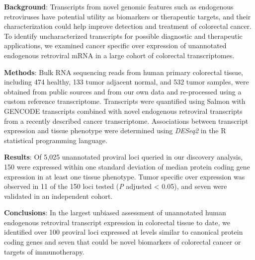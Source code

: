 \textbf{Background}:
Transcripts from novel genomic features such as endogenous retroviruses have potential utility as biomarkers or therapeutic targets, and their characterization could help improve detection and treatment of colorectal cancer.
To identify uncharacterized transcripts for possible diagnostic and therapeutic applications, we examined cancer specific over expression of unannotated endogenous retroviral mRNA in a large cohort of colorectal transcriptomes.

\textbf{Methods}:
Bulk RNA sequencing reads from human primary colorectal tissue, including 474 healthy, 133 tumor adjacent normal, and 532 tumor samples, were obtained from public sources and from our own data and re-processed using a custom reference transcriptome.
Transcripts were quantified using Salmon with GENCODE transcripts combined with novel endogenous retroviral transcripts from a recently described cancer transcriptome.
Associations between transcript expression and tissue phenotype were determined using \emph{DESeq2} in the R statistical programming language.

\textbf{Results}:
Of 5,025 unannotated proviral loci queried in our discovery analysis, 150 were expressed within one standard deviation of median protein coding gene expression in at least one tissue phenotype.
Tumor specific over expression was observed in 11 of the 150 loci tested (\emph{P} adjusted < 0.05), and seven were validated in an independent cohort.

\textbf{Conclusions}:
In the largest unbiased assessment of unannotated human endogenous retroviral transcript expression in colorectal tissue to date, we identified over 100 proviral loci expressed at levels similar to canonical protein coding genes and seven that could be novel biomarkers of colorectal cancer or targets of immunotherapy.
